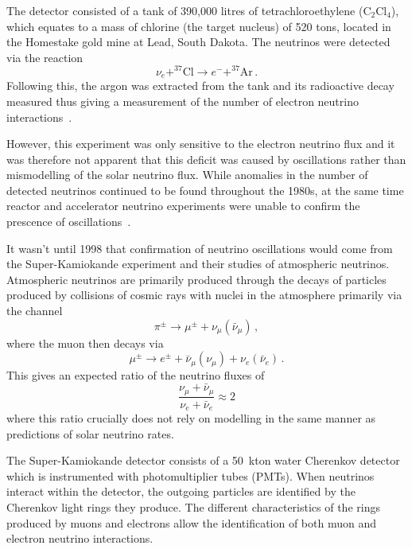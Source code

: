The detector consisted of a tank of 390,000 litres of tetrachloroethylene ($\text{C}_{2}\text{Cl}_{4}$), which equates to a mass of chlorine (the target nucleus) of 520 tons, located in the Homestake gold mine at Lead, South Dakota.
The neutrinos were detected via the reaction
\begin{equation}
  \nu_{e} + ^{37}\text{Cl} \rightarrow e^{-} + ^{37}\text{Ar} \, .
\end{equation}
Following this, the argon was extracted from the tank and its radioactive decay measured thus giving a measurement of the number of electron neutrino interactions~\cite{rayDavis}.

However, this experiment was only sensitive to the electron neutrino flux and it was therefore not apparent that this deficit was caused by oscillations rather than mismodelling of the solar neutrino flux.
While anomalies in the number of detected neutrinos continued to be found throughout the 1980s, at the same time reactor and accelerator neutrino experiments were unable to confirm the prescence of oscillations~\cite{neutrinoHistory}.

It wasn't until 1998 that confirmation of neutrino oscillations would come from the Super-Kamiokande experiment and their studies of atmospheric neutrinos.
Atmospheric neutrinos are primarily produced through the decays of particles produced by collisions of cosmic rays with nuclei in the atmosphere primarily via the channel
\begin{equation}
  \pi^{\pm} \rightarrow \mu^{\pm} + \nu_{\mu}(\bar{\nu}_{\mu}) \, , 
\end{equation}
where the muon then decays via
\begin{equation}
  \mu^{\pm} \rightarrow e^{\pm} + \bar{\nu}_{\mu}(\nu_{\mu}) + \nu_{e}(\bar{\nu}_{e}) \, .
\end{equation}
This gives an expected ratio of the neutrino fluxes of
\begin{equation}
  \frac{\nu_{\mu} + \bar{\nu}_{\mu}}{\nu_{e} + \bar{\nu}_{e}} \approx 2
\end{equation}
where this ratio crucially does not rely on modelling in the same manner as predictions of solar neutrino rates.

The Super-Kamiokande detector consists of a 50~kton water Cherenkov detector which is instrumented with photomultiplier tubes (PMTs).
When neutrinos interact within the detector, the outgoing particles are identified by the Cherenkov light rings they produce.
The different characteristics of the rings produced by muons and electrons allow the identification of both muon and electron neutrino interactions.

